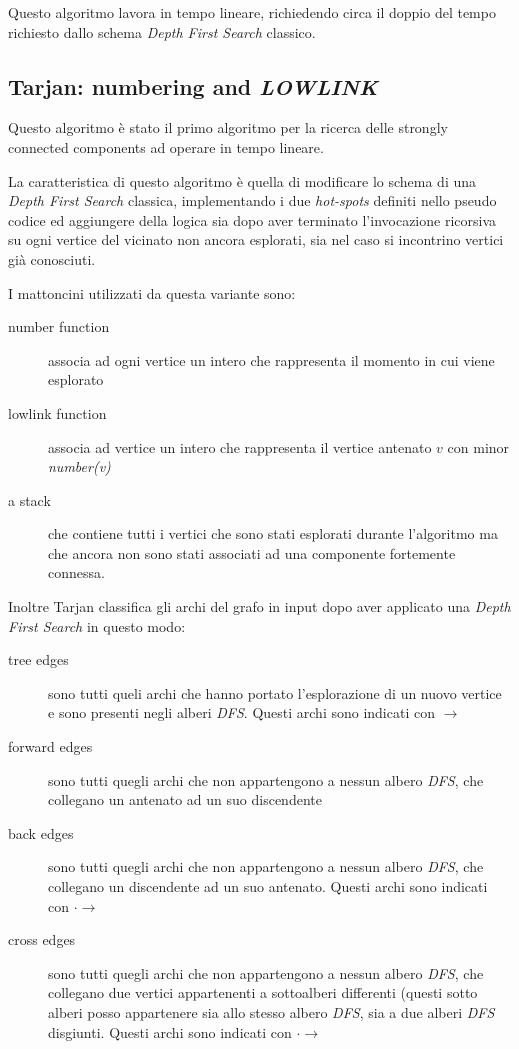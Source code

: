 Questo algoritmo lavora in tempo lineare, richiedendo circa il doppio
del tempo richiesto dallo schema \emph{Depth First Search} classico.

\subsection{Tarjan: numbering and \emph{LOWLINK}}
\label{subsection:tarjan-algorithm}
Questo algoritmo \`e stato il primo algoritmo per la ricerca delle
strongly connected components ad operare in tempo lineare.

La caratteristica di questo algoritmo \`e quella di modificare lo
schema di una \emph{Depth First Search} classica, implementando i due
\emph{hot-spots} definiti nello pseudo codice ed aggiungere della
logica sia dopo aver terminato l'invocazione ricorsiva su ogni vertice
del vicinato non ancora esplorati, sia nel caso si incontrino vertici
gi\`a conosciuti.

I mattoncini utilizzati da questa variante sono:
\begin{description}
\item[number function] associa ad ogni vertice un intero che
  rappresenta il momento in cui viene esplorato
\item[lowlink function] associa ad vertice un intero che rappresenta
  il vertice antenato $v$ con minor \emph{number(v)}
\item[a stack] che contiene tutti i vertici che sono stati esplorati
  durante l'algoritmo ma che ancora non sono stati associati ad una
  componente fortemente connessa.
\end{description}

Inoltre Tarjan classifica gli archi del grafo in input dopo aver
applicato una \emph{Depth First Search} in questo modo: 
\begin{description}
\item[tree edges] sono tutti queli archi che hanno portato
  l'esplorazione di un nuovo vertice e sono presenti negli alberi
  \emph{DFS}. Questi archi sono indicati con $\rightarrow$
\item[forward edges] sono tutti quegli archi che non appartengono a
  nessun albero \emph{DFS}, che collegano un antenato ad un suo
  discendente
\item[back edges] sono tutti quegli archi che non appartengono a
  nessun albero \emph{DFS}, che collegano un discendente ad un suo
  antenato. Questi archi sono indicati con $\cdot\rightarrow$
\item[cross edges] sono tutti quegli archi che non appartengono a
  nessun albero \emph{DFS}, che collegano due vertici appartenenti a
  sottoalberi differenti (questi sotto alberi posso appartenere sia
  allo stesso albero \emph{DFS}, sia a due alberi \emph{DFS}
  disgiunti. Questi archi sono indicati con $\cdot\rightarrow$
\end{description}

